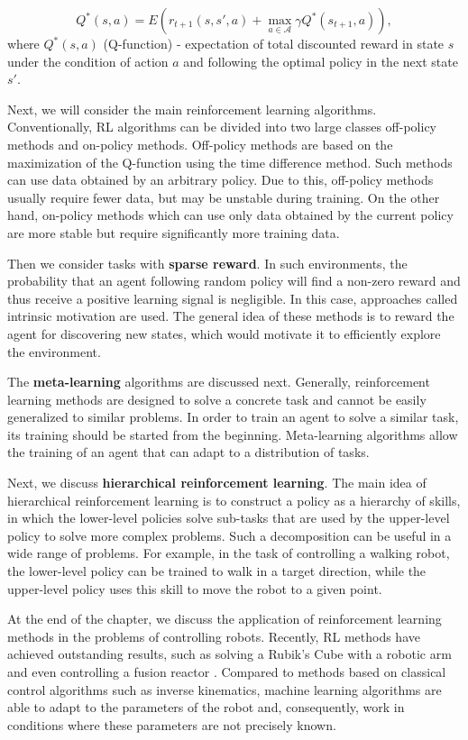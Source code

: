 \[
	Q^*(s, a) = E(r_{t + 1}(s, s', a) + \max_{a \in \mathcal{A}} \gamma Q^*(s_{t + 1}, a)),
\]
where $Q^*(s, a)$ (Q-function) - expectation of total discounted reward in state $s$ under the condition of action $a$ and following the optimal policy in the next state $s'$.

Next, we will consider the main reinforcement learning algorithms. Conventionally, RL algorithms can be divided into two large classes off-policy methods and on-policy methods. Off-policy methods are based on the maximization of the Q-function using the time difference method. Such methods can use data obtained by an arbitrary policy. Due to this, off-policy methods usually require fewer data, but may be unstable during training. On the other hand, on-policy methods which can use only data obtained by the current policy are more stable but require significantly more training data. 

Then we consider tasks with \textbf{sparse reward}. In such environments, the probability that an agent following random policy will find a non-zero reward and thus receive a positive learning signal is negligible. In this case, approaches called intrinsic motivation are used. The general idea of these methods is to reward the agent for discovering new states, which would motivate it to efficiently explore the environment.

The \textbf{meta-learning} algorithms are discussed next. Generally, reinforcement learning methods are designed to solve a concrete task and cannot be easily generalized to similar problems. In order to train an agent to solve a similar task, its training should be started from the beginning. Meta-learning algorithms allow the training of an agent that can adapt to a distribution of tasks. 

Next, we discuss \textbf{hierarchical reinforcement learning}. The main idea of hierarchical reinforcement learning is to construct a policy as a hierarchy of skills, in which the lower-level policies solve sub-tasks that are used by the upper-level policy to solve more complex problems. Such a decomposition can be useful in a wide range of problems. For example, in the task of controlling a walking robot, the lower-level policy can be trained to walk in a target direction, while the upper-level policy uses this skill to move the robot to a given point.

At the end of the chapter, we discuss the application of reinforcement learning methods in the problems of controlling robots. Recently, RL methods have achieved outstanding results, such as solving a Rubik's Cube with a robotic arm \cite{rubic} and even controlling a fusion reactor \cite{tokomak}. Compared to methods based on classical control algorithms such as inverse kinematics, machine learning algorithms are able to adapt to the parameters of the robot and, consequently, work in conditions where these parameters are not precisely known.

